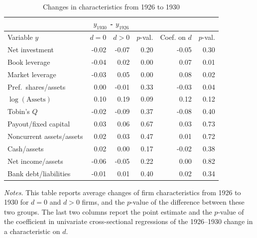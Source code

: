 \begin{table}[p]
\centering
\caption{\\ Changes in characteristics from 1926 to 1930} \scriptsize \label{tab:pretrend}
\begin{tabular}{lrrrrr}
\toprule
\multicolumn{6}{c}{\emph{$y_{1930}$ - $ y_{1926}$}} \\
\midrule
Variable $y$ & $d=0$ & $d>0$ & $p$-val. & Coef. on $d$ & $p$-val. \\
\midrule
Net investment            & -0.02 & -0.07 & 0.20 & -0.05 & 0.30 \\
Book leverage             & -0.04 &  0.02 & 0.00 &  0.07 & 0.01 \\
Market leverage           & -0.03 &  0.05 & 0.00 &  0.08 & 0.02 \\
Pref.\ shares/assets      &  0.00 & -0.01 & 0.33 & -0.03 & 0.04 \\
$\log(\text{Assets})$     &  0.10 &  0.19 & 0.09 &  0.12 & 0.12 \\
Tobin's $Q$               & -0.02 & -0.09 & 0.37 & -0.08 & 0.40 \\
Payout/fixed capital      &  0.03 &  0.06 & 0.67 &  0.03 & 0.73 \\
Noncurrent assets/assets  &  0.02 &  0.03 & 0.47 &  0.01 & 0.72 \\
Cash/assets               &  0.02 &  0.00 & 0.17 & -0.02 & 0.38 \\
Net income/assets         & -0.06 & -0.05 & 0.22 &  0.00 & 0.82 \\
Bank debt/liabilities     & -0.01 &  0.01 & 0.40 &  0.02 & 0.34 \\
\bottomrule
\end{tabular}

\vspace*{3mm} \justifying \noindent
\scriptsize{\textit{Notes.} This table reports average changes of firm characteristics from 1926 to 1930 for $d = 0$ and $d > 0$ firms, and the $p$-value of the difference between these two groups. The last two columns report the point estimate and the $p$-value of the coefficient in univariate cross-sectional regressions of the 1926--1930 change in a characteristic on $d$.}
\end{table}